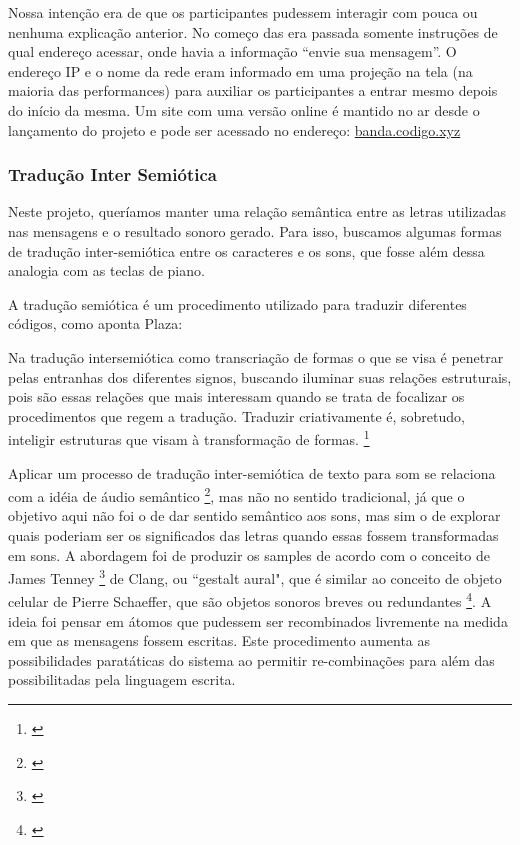 Nossa intenção era de que os participantes pudessem interagir com pouca ou nenhuma explicação anterior. No começo das era passada somente instruções de qual endereço acessar, onde havia a informação ``envie sua mensagem''. O endereço IP e o nome da rede eram informado em uma projeção na tela (na maioria das performances) para auxiliar os participantes a entrar mesmo depois do início da mesma. Um site com uma versão online é mantido no ar desde o lançamento do projeto e pode ser acessado no endereço: \url{banda.codigo.xyz}




\subsubsection{Tradução Inter Semiótica}
\label{sec:trad}

%

Neste projeto, queríamos manter uma relação semântica entre as letras utilizadas nas mensagens e o resultado sonoro gerado. Para isso, buscamos algumas formas de tradução inter-semiótica entre os caracteres e os sons, que fosse além dessa analogia com as teclas de piano.






 A tradução semiótica é um procedimento utilizado para traduzir diferentes códigos, como aponta Plaza: 

\begin{citacao}
Na tradução intersemiótica como transcriação de formas o que se visa é penetrar pelas entranhas dos diferentes signos, buscando iluminar suas relações estruturais, pois são essas relações que mais interessam quando se trata de focalizar os procedimentos que regem a tradução. Traduzir criativamente é, sobretudo, inteligir estruturas que visam à transformação de formas. \footnote{\cite[71]{JulioPlaza1969}}
\end{citacao}

Aplicar um processo de tradução inter-semiótica de texto para som se relaciona com a idéia de áudio semântico \footnote{\cite{Kostek:2010}}, mas não no sentido tradicional, já que o objetivo aqui não foi o de dar sentido semântico aos sons, mas sim o de explorar quais poderiam ser os significados das letras quando essas fossem transformadas em sons. A abordagem foi de produzir os samples de acordo com o conceito de James Tenney \footnote{\cite{Tenney1988}} de Clang, ou ``gestalt aural", que é similar ao conceito de objeto celular de Pierre Schaeffer, que são objetos sonoros breves ou redundantes \footnote{\cite{Chion1983}}. A ideia foi pensar em átomos que pudessem ser recombinados livremente na medida em que as mensagens fossem escritas. Este procedimento aumenta as possibilidades paratáticas do sistema ao permitir re-combinações para além das possibilitadas pela linguagem escrita.

